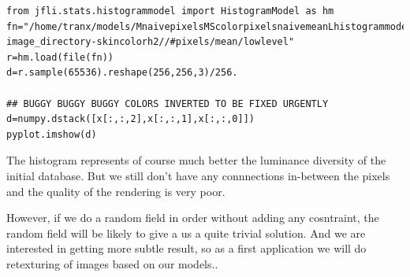 \documentclass{report}
\begin{document}
\begin{lstlisting}
from jfli.stats.histogrammodel import HistogramModel as hm
fn="/home/tranx/models/MnaivepixelsMScolorpixelsnaivemeanLhistogrammodelHistogramModel161616000255255255-image_directory-skincolorh2//#pixels/mean/lowlevel"
r=hm.load(file(fn))
d=r.sample(65536).reshape(256,256,3)/256.

## BUGGY BUGGY BUGGY COLORS INVERTED TO BE FIXED URGENTLY
d=numpy.dstack([x[:,:,2],x[:,:,1],x[:,:,0]])
pyplot.imshow(d)

\end{lstlisting}














The histogram represents of course much better the luminance diversity of the initial database.
But we still don't have any connnections in-between the pixels and the quality of the rendering is very poor.

However, if we do a random field in order without adding any cosntraint, the random field will be likely to give a us a quite trivial solution.
And we are interested in getting more subtle result, so as a first application we will do retexturing of images based on our models..
\end{document}
